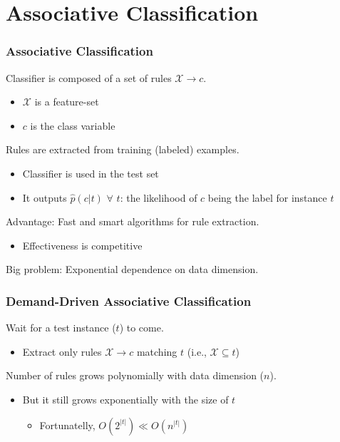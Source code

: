 \documentclass{beamer}
\begin{document}
\section{Associative Classification}
\begin{frame}\frametitle{Associative Classification}

Classifier is composed of a set of rules $\mathcal{X}\to c$.

\begin{itemize}
\item $\mathcal{X}$ is a feature-set
\item $c$ is the class variable
\end{itemize}

Rules are extracted from training (labeled) examples.

\begin{itemize}
\item Classifier is used in the test set
\item It outputs $\hat{p}(c|t)$ $\forall$ $t$: the likelihood of $c$ being the label for instance $t$
\end{itemize}

Advantage: Fast and smart algorithms for rule extraction.

\begin{itemize}
\item Effectiveness is competitive
\end{itemize}

\pause

Big problem: \alert{Exponential dependence on data dimension.}

\end{frame}

\begin{frame}\frametitle{Demand-Driven Associative Classification}

Wait for a test instance ($t$) to come.

\begin{itemize}
\item Extract only rules $\mathcal{X}\to c$ matching $t$ (i.e., $\mathcal{X}\subseteq t$)
\end{itemize}

Number of rules grows polynomially with data dimension ($n$).

\begin{itemize}
\item But it still grows exponentially with the size of $t$
\begin{itemize}
\item Fortunatelly, $O(2^{|t|})\ll O(n^{|t|})$
\end{itemize}
\end{itemize}

\end{frame}
\end{document}
